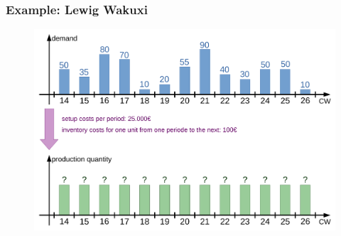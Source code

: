 \begin{frame}
 \frametitle{Example: Lewig Wakuxi}
 \begin{figure}
  \centering
  \includegraphics[width=\linewidth]{Bilder/WagnerWhitinProblem}
 \end{figure}
\end{frame}

